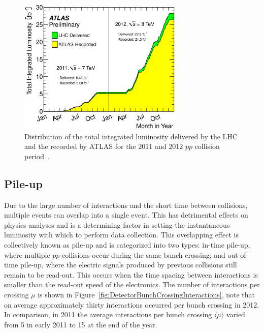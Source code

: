 \begin{figure}[htbp]
  \centering
    \includegraphics[width=0.70\textwidth]{PartDetector/Plots/IntegratedLuminosity20112012.eps}
    \caption[Distribution of the total integrated luminosity delivered by the LHC and the recorded by ATLAS for the 2011 and 2012 $pp$ collision period.]{Distribution of the total integrated luminosity delivered by the LHC and the recorded by ATLAS for the 2011 and 2012 $pp$ collision period~\cite{Detector:LuminosityResults,Luminosity}.}\label{fig:DetectorIntLumi}
\end{figure}

\subsection{Pile-up}

Due to the large number of interactions and the short time between collisions, multiple events can overlap into a single event. This has detrimental effects on physics analyses and is a determining factor in setting the instantaneous luminosity with which to perform data collection. This overlapping effect is collectively known as pile-up and is categorized into two types: in-time pile-up, where multiple $pp$ collisions occur during the same bunch crossing; and out-of-time pile-up, where the electric signals produced by previous collisions still remain to be read-out. This occurs when the time spacing between interactions is smaller than the read-out speed of the electronics. The number of interactions per crossing $\mu$ is shown in Figure~\ref{fig:DetectorBunchCrossingInteractions}, note that on average approximately thirty interactions occurred per bunch crossing in 2012. In comparison, in 2011 the average interactions per bunch crossing $\langle\mu\rangle$ varied from 5 in early 2011 to 15 at the end of the year.

